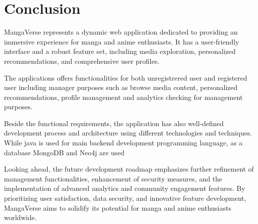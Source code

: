 \section{Conclusion}

MangaVerse represents a dynamic web application dedicated to providing an immersive experience for manga and anime enthusiasts. It has a user-friendly interface and a robust feature set, including media exploration, personalized recommendations, and comprehensive user profiles.

The applications offers functionalities for both unregistrered user and registered user including manager purposes such as browse
media content, personalized recommendations, profile management and analytics checking for management purposes.

Beside the functional requirements, the application has also well-defined development process and architecture using
different technologies and techniques. While java is used for main backend development programming language, as a database MongoDB and
Neo4j are used

Looking ahead, the future development roadmap emphasizes further refinement of management functionalities, enhancement of security measures, and the implementation of advanced analytics and community engagement features. By prioritizing user satisfaction, data security, and innovative feature development, MangaVerse aims to solidify its potential for manga and anime enthusiasts worldwide.